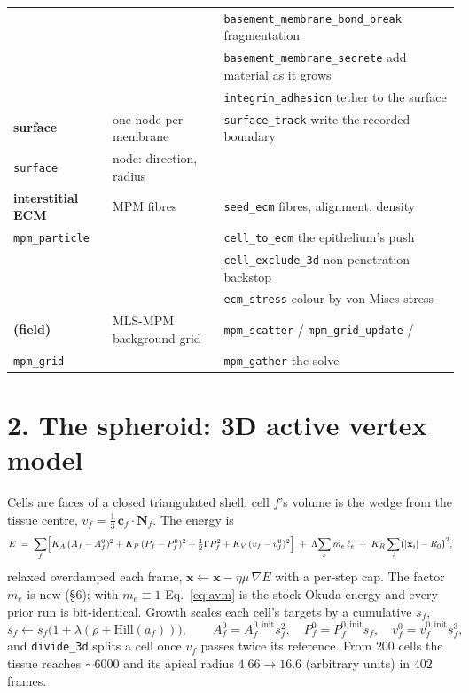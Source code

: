 \documentclass[10pt,a4paper]{article}
\newcommand{\op}[1]{\texttt{#1}}
\begin{document}
{\begin{tabular}{@{}lll@{}}
                             &                         & \op{basement\_membrane\_bond\_break} \quad fragmentation\\
                             &                         & \op{basement\_membrane\_secrete} \quad add material as it grows\\
                             &                         & \op{integrin\_adhesion} \quad tether to the surface\\
\midrule
\textbf{surface}             & one node per membrane   & \op{surface\_track} \quad write the recorded boundary\\
\op{surface}                 & node: direction, radius &\\
\midrule
\textbf{interstitial ECM}    & MPM fibres              & \op{seed\_ecm} \quad fibres, alignment, density\\
\op{mpm\_particle}           &                         & \op{cell\_to\_ecm} \quad the epithelium's push\\
                             &                         & \op{cell\_exclude\_3d} \quad non-penetration backstop\\
                             &                         & \op{ecm\_stress} \quad colour by von Mises stress\\
\midrule
\textbf{(field)}             & MLS-MPM background grid & \op{mpm\_scatter} / \op{mpm\_grid\_update} /\\
\op{mpm\_grid}               &                         & \op{mpm\_gather} \quad the solve\\
\bottomrule
\end{tabular}}
\smallskip

\section*{2.\; The spheroid: 3D active vertex model}

Cells are faces of a closed triangulated shell; cell $f$'s volume is the wedge from the tissue centre,
$v_f=\tfrac13\,\mathbf{c}_f\!\cdot\!\mathbf{N}_f$. The energy is
%
\begin{equation}
E \;=\; \sum_f\Bigl[K_A\,(A_f-A_f^0)^2 + K_P\,(P_f-P_f^0)^2 + \tfrac12\Gamma P_f^2 + K_V\,(v_f-v_f^0)^2\Bigr]
\;+\;\Lambda\!\sum_e m_e\,\ell_e\;+\;K_R\sum_i\bigl(|\mathbf{x}_i|-R_0\bigr)^2 ,
\label{eq:avm}
\end{equation}
%
relaxed overdamped each frame, $\mathbf{x}\leftarrow\mathbf{x}-\eta\mu\,\nabla E$ with a per-step cap.
The factor $m_e$ is new (\S6); with $m_e\equiv1$ Eq.~\eqref{eq:avm} is the stock Okuda energy and every
prior run is bit-identical. Growth scales each cell's targets by a cumulative $s_f$,
%
\begin{equation}
s_f \leftarrow s_f\bigl(1+\lambda(\rho+\mathrm{Hill}(a_f))\bigr),\qquad
A_f^0=A_f^{0,\text{init}}s_f^2,\quad P_f^0=P_f^{0,\text{init}}s_f,\quad v_f^0=v_f^{0,\text{init}}s_f^3,
\label{eq:growth}
\end{equation}
%
and \op{divide\_3d} splits a cell once $v_f$ passes twice its reference. From $200$ cells the tissue
reaches $\sim6000$ and its apical radius $4.66\to16.6$ (arbitrary units) in $402$ frames.
\end{document}

